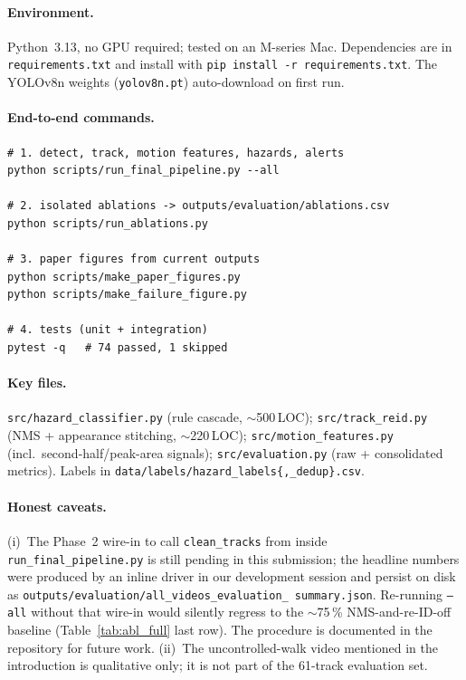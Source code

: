 \documentclass[10pt,twocolumn,letterpaper]{article}
\begin{document}
\paragraph{Environment.} Python~3.13, no GPU required; tested on an
M-series Mac. Dependencies are in \texttt{requirements.txt} and
install with \texttt{pip install -r requirements.txt}. The YOLOv8n
weights (\texttt{yolov8n.pt}) auto-download on first run.

\paragraph{End-to-end commands.}
\begin{verbatim}
# 1. detect, track, motion features, hazards, alerts
python scripts/run_final_pipeline.py --all

# 2. isolated ablations -> outputs/evaluation/ablations.csv
python scripts/run_ablations.py

# 3. paper figures from current outputs
python scripts/make_paper_figures.py
python scripts/make_failure_figure.py

# 4. tests (unit + integration)
pytest -q   # 74 passed, 1 skipped
\end{verbatim}

\paragraph{Key files.} \texttt{src/hazard\_classifier.py} (rule
cascade, $\sim$500\,LOC); \texttt{src/track\_reid.py} (NMS +
appearance stitching, $\sim$220\,LOC);
\texttt{src/motion\_features.py} (incl.\ second-half/peak-area
signals); \texttt{src/evaluation.py} (raw + consolidated metrics).
Labels in \texttt{data/labels/hazard\_labels\{,\_dedup\}.csv}.

\paragraph{Honest caveats.} (i)~The Phase~2 wire-in to call
\texttt{clean\_tracks} from inside \texttt{run\_final\_pipeline.py}
is still pending in this submission; the headline numbers were
produced by an inline driver in our development session and persist
on disk as \texttt{outputs/evaluation/all\_videos\_evaluation\_
summary.json}. Re-running \texttt{--all} without that wire-in would
silently regress to the $\sim$75\,\% NMS-and-re-ID-off baseline
(Table~\ref{tab:abl_full} last row). The procedure is documented in
the repository for future work. (ii)~The uncontrolled-walk video
mentioned in the introduction is qualitative only; it is not part of
the 61-track evaluation set.
\end{document}
